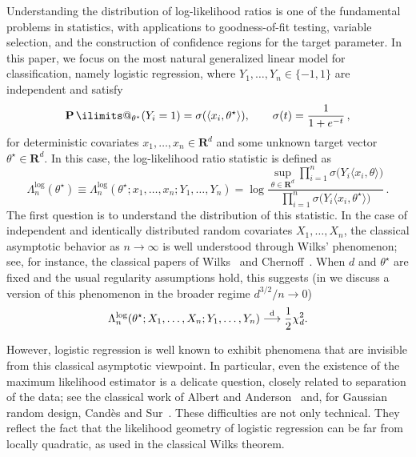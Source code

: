 \documentclass[11pt, letterpaper, hidelinks]{article}
\makeatletter
\newcommand{\R}{\mathbf R}
\newcommand{\1}{\mathbf 1}
\newcommand{\distto}{\stackrel{\rm d}{\longrightarrow}}
\renewcommand{\P}{\operatorname*{\mathbf{P}}\ilimits@}
\theoremstyle{plain}
\theoremstyle{definition}
\newcommand{\thetastar}{\theta^\star}
\makeatother
\begin{document}
Understanding the distribution of log-likelihood ratios is one of the
fundamental problems in statistics, with applications to goodness-of-fit
testing, variable selection, and the construction of confidence regions for the target
parameter. In this paper, we focus on the most natural generalized linear model
for classification, namely logistic regression, where
\(Y_1,\dots,Y_n\in\{-1,1\}\) are independent and satisfy
\[
\P_{\thetastar}(Y_i=1)
=
\sigma(\langle x_i,\thetastar\rangle),
\qquad
\sigma(t)=\frac{1}{1+e^{-t}} \, ,
\]
for deterministic covariates \(x_1,\dots,x_n\in\R^d\) and some unknown target
vector \(\thetastar\in\R^d\). In this case, the log-likelihood ratio statistic is
defined as
\begin{equation}
\label{eq:def-logistic-llr}
\Lambda_n^{\log}(\thetastar)
	\equiv \Lambda_n^{\log}(\thetastar;x_1,\ldots,x_n; Y_1, \ldots, Y_n)
	= \log \frac{\sup_{\theta\in\R^d}\prod_{i=1}^n\sigma\bigl(Y_i\langle x_i,\theta\rangle\bigr)}
		{\prod_{i=1}^n \sigma\bigl(Y_i\langle x_i,\thetastar\rangle\bigr)} \, .
\end{equation}
The first question is to understand the distribution of this
statistic. In the case of independent and identically distributed random
covariates \(X_1,\ldots,X_n\), the classical asymptotic behavior as
\(n\to\infty\) is well understood through Wilks' phenomenon; see, for instance,
the classical papers of Wilks~\cite[pp.~62]{wilks1938large} and
Chernoff~\cite[Theorem~1]{chernoff1954likelihood}. When \(d\) and
\(\thetastar\) are fixed and the usual regularity assumptions hold, this
suggests (in  we discuss a version of this phenomenon in the broader regime $d^{3/2}/n \to 0$)
\[
\Lambda_n^{\operatorname{log}}(\thetastar;X_1,\ldots,X_n; Y_1, \ldots, Y_n)
\distto
\frac12\chi_d^2.
\]

However, logistic regression is well known to exhibit phenomena that are
invisible from this classical asymptotic viewpoint. In particular, even the
existence of the maximum likelihood estimator is a delicate question, closely
related to separation of the data; see the classical work of Albert and
Anderson~\cite{AlbertAnderson1984LogisticMLE} and, for Gaussian random design,
Candès and Sur~\cite{CandesSur2020PhaseTransition}. These difficulties are not only
technical. They reflect the fact that the likelihood geometry of logistic
regression can be far from locally quadratic, as used in the classical Wilks
theorem.
\end{document}
